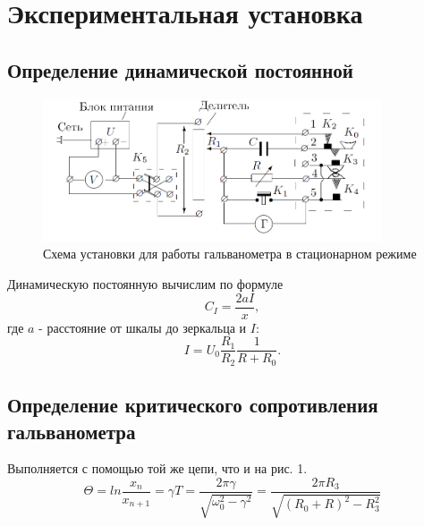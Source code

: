 \documentclass[a4paper]{article}
\begin{document}
\section{Экспериментальная установка}
\subsection{Определение динамической постоянной}
\begin{figure}[H]
    \centering
    \includegraphics[width=10cm]{fig1.PNG}
    \caption{Схема установки для работы гальванометра в стационарном режиме}
    \label{fig:vac}
\end{figure}
Динамическую постоянную вычислим по формуле
\begin{equation}
    C_I = \frac{2aI}{x},
\end{equation}
где $a$ - расстояние от шкалы до зеркальца и $I$:
\begin{equation}
    I = U_0 \frac{R_1}{R_2} \frac{1}{R + R_0}.
\end{equation}

\subsection{Определение критического сопротивления гальванометра}
Выполняется с помощью той же цепи, что и на рис. 1. 
\begin{equation}
    \Theta = ln\frac{x_n}{x_{n+1}} = \gamma T = \frac{2\pi \gamma}{\sqrt{\omega_0^2 - \gamma^2}} = \frac{2\pi R_3}{\sqrt{(R_0 + R)^2 - R_3^2}}
\end{equation}
\end{document}
